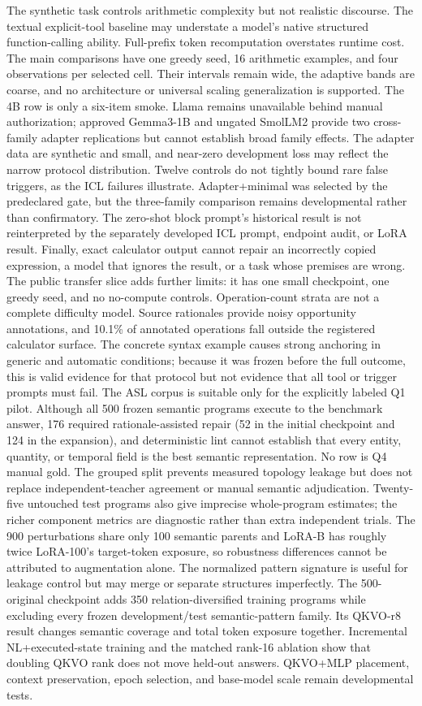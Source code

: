 \documentclass[11pt]{article}
\begin{document}
The synthetic task controls arithmetic complexity but not realistic discourse.
The textual explicit-tool baseline may understate a model's native structured
function-calling ability. Full-prefix token recomputation overstates runtime
cost. The main comparisons have one greedy seed, 16 arithmetic examples, and
four observations per selected cell. Their intervals remain wide, the adaptive
bands are coarse, and no architecture or universal scaling generalization is
supported. The 4B row is only a six-item smoke. Llama remains unavailable behind
manual authorization; approved Gemma3-1B and ungated SmolLM2 provide two
cross-family adapter replications but cannot establish broad family effects. The adapter
data are synthetic and small, and near-zero development loss may reflect the
narrow protocol distribution. Twelve controls do not tightly bound rare false
triggers, as the ICL failures illustrate. Adapter+minimal was selected by the
predeclared gate, but the three-family comparison remains developmental rather than
confirmatory. The zero-shot block prompt's historical result is not reinterpreted
by the separately developed ICL prompt, endpoint audit, or LoRA result.
Finally, exact calculator output cannot repair an incorrectly copied
expression, a model that ignores the result, or a task whose premises are wrong.
The public transfer slice adds further limits: it has one small checkpoint, one
greedy seed, and no no-compute controls. Operation-count strata are not a complete
difficulty model. Source rationales provide noisy opportunity annotations, and
10.1\% of annotated operations fall outside the registered calculator surface.
The concrete syntax example causes strong anchoring in generic and automatic
conditions; because it was frozen before the full outcome, this is valid evidence
for that protocol but not evidence that all tool or trigger prompts must fail.
The ASL corpus is suitable only for the explicitly labeled Q1 pilot. Although all
500 frozen semantic programs execute to the benchmark answer, 176 required
rationale-assisted repair (52 in the initial checkpoint and 124 in the
expansion), and deterministic lint cannot establish that every
entity, quantity, or temporal field is the best semantic representation. No row
is Q4 manual gold. The grouped split prevents measured topology leakage but does
not replace independent-teacher agreement or manual semantic adjudication.
Twenty-five untouched test programs also give imprecise whole-program estimates;
the richer component metrics are diagnostic rather than extra independent trials.
The 900 perturbations share only 100 semantic parents and LoRA-B has roughly twice
LoRA-100's target-token exposure, so robustness differences cannot be attributed
to augmentation alone. The normalized pattern signature is useful for leakage
control but may merge or separate structures imperfectly. The 500-original
checkpoint adds 350 relation-diversified training programs while excluding every
frozen development/test semantic-pattern family. Its QKVO-r8 result changes
semantic coverage and total token exposure together. Incremental
NL+executed-state training and the matched rank-16 ablation show that doubling
QKVO rank does not move held-out answers. QKVO+MLP placement, context
preservation, epoch selection, and base-model scale remain developmental tests.
\end{document}
